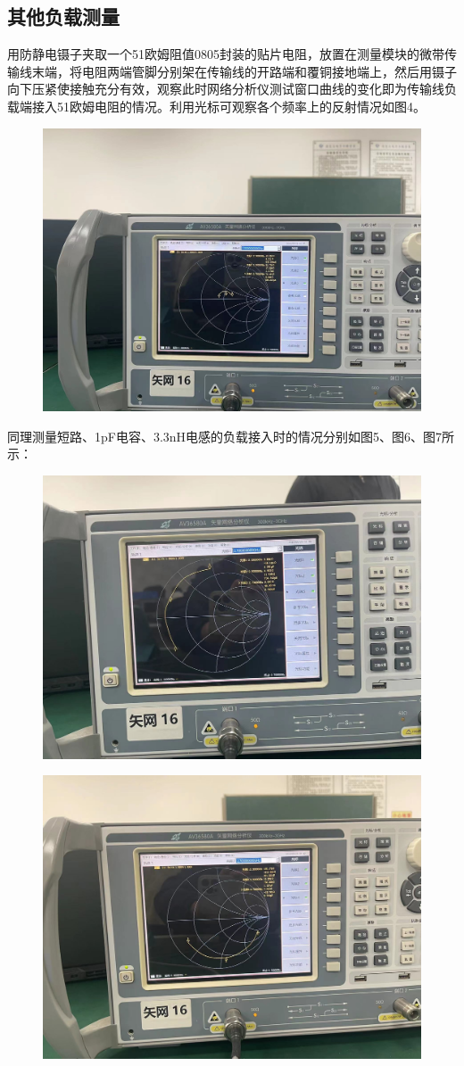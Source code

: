 \documentclass{source/Report}
\begin{document}
\subsection{其他负载测量}
用防静电镊子夹取一个51欧姆阻值0805封装的贴片电阻，放置在测量模块的微带传输线末端，将电阻两端管脚分别架在传输线的开路端和覆铜接地端上，然后用镊子向下压紧使接触充分有效，观察此时网络分析仪测试窗口曲线的变化即为传输线负载端接入51欧姆电阻的情况。利用光标可观察各个频率上的反射情况如图4。
\begin{figure}[H]
    \begin{center}
        \includegraphics[width=0.4\linewidth]{pic/cb1_p4.jpg}
        \caption{}
    \end{center}
\end{figure}
同理测量短路、1pF电容、3.3nH电感的负载接入时的情况分别如图5、图6、图7所示：
\begin{figure}[H]
    \begin{center}
        \includegraphics[width=0.4\linewidth]{pic/cb1_p5.jpg}
        \caption{}
    \end{center}
\end{figure}
\begin{figure}[H]
    \begin{center}
        \includegraphics[width=0.4\linewidth]{pic/cb1_p6.jpg}
        \caption{}
    \end{center}
\end{figure}
\end{document}
